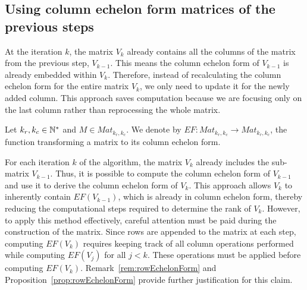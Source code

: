 \documentclass[11pt]{llncs}
\begin{document}
\subsection{Using column echelon form matrices of the previous steps}\label{subsubsection:optEchelonForm}

At the iteration \(k\), the matrix  \(V_k\) already contains all the columns of the matrix from the previous step, \(V_{k-1}\). This means the column echelon form of \(V_{k-1}\) is already embedded within \(V_{k}\). Therefore, instead of recalculating the column echelon form for the entire matrix \(V_{k}\), we only need to update it for the newly added column. This approach saves computation because we are focusing only on the last column rather than reprocessing the whole matrix.

\begin{definition}
    Let $k_r,k_c\in \mathbb{N}^*$ and $M \in Mat_{k_r,k_c}$.
    We denote by $EF: Mat_{k_r,k_c} \rightarrow Mat_{k_r,k_c}$, the function transforming a matrix to its column echelon form.    
\end{definition}




For each iteration \( k \) of the algorithm, the matrix \( V_k \) already includes the sub-matrix \( V_{k-1} \). Thus, it is possible to compute the column echelon form of \( V_{k-1} \) and use it to derive the column echelon form of \( V_k \). 
This approach allows \( V_k \) to inherently contain \( EF(V_{k-1}) \), which is already in column echelon form, thereby reducing the computational steps required to determine the rank of \( V_k \).
However, to apply this method effectively, careful attention must be paid during the construction of the matrix. 
Since rows are appended to the matrix at each step, computing \( EF(V_k) \) requires keeping track of all column operations performed while computing \( EF(V_j) \) for all \( j < k \). 
These operations must be applied before computing \( EF(V_k) \).
Remark~\ref{rem:rowEchelonForm} and Proposition~\ref{prop:rowEchelonForm} provide further justification for this claim.
\end{document}
